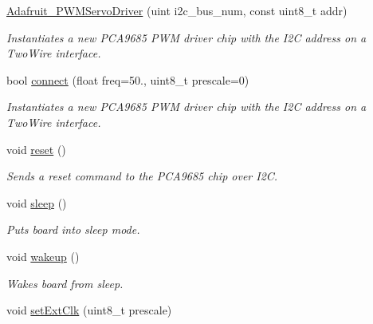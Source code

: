 \begin{DoxyCompactItemize}
\item 
\hyperlink{classAdafruit__PWMServoDriver_abbbbdc51fe0ffb92f7c4d1b2ab1ec6b6}{Adafruit\+\_\+\+P\+W\+M\+Servo\+Driver} (uint i2c\+\_\+bus\+\_\+num, const uint8\+\_\+t addr)
\begin{DoxyCompactList}\small\item\em Instantiates a new P\+C\+A9685 P\+WM driver chip with the I2C address on a Two\+Wire interface. \end{DoxyCompactList}\item 
bool \hyperlink{classAdafruit__PWMServoDriver_af82d0facef94e15e9e91bab62e4835e3}{connect} (float freq=50., uint8\+\_\+t prescale=0)
\begin{DoxyCompactList}\small\item\em Instantiates a new P\+C\+A9685 P\+WM driver chip with the I2C address on a Two\+Wire interface. \end{DoxyCompactList}\item 
\mbox{\label{classAdafruit__PWMServoDriver_a5f25f9f07525e08b7622c476b4a1f379}} 
void \hyperlink{classAdafruit__PWMServoDriver_a5f25f9f07525e08b7622c476b4a1f379}{reset} ()
\begin{DoxyCompactList}\small\item\em Sends a reset command to the P\+C\+A9685 chip over I2C. \end{DoxyCompactList}\item 
\mbox{\label{classAdafruit__PWMServoDriver_aa892432ed08e4b3892c8eb0478168dd8}} 
void \hyperlink{classAdafruit__PWMServoDriver_aa892432ed08e4b3892c8eb0478168dd8}{sleep} ()
\begin{DoxyCompactList}\small\item\em Puts board into sleep mode. \end{DoxyCompactList}\item 
\mbox{\label{classAdafruit__PWMServoDriver_a34b9ac672853a4a1b7fc202b4c89d8c4}} 
void \hyperlink{classAdafruit__PWMServoDriver_a34b9ac672853a4a1b7fc202b4c89d8c4}{wakeup} ()
\begin{DoxyCompactList}\small\item\em Wakes board from sleep. \end{DoxyCompactList}\item 
void \hyperlink{classAdafruit__PWMServoDriver_a7967e51188cbacf2c3f269c8aec9d292}{set\+Ext\+Clk} (uint8\+\_\+t prescale)

\end{DoxyCompactItemize}
